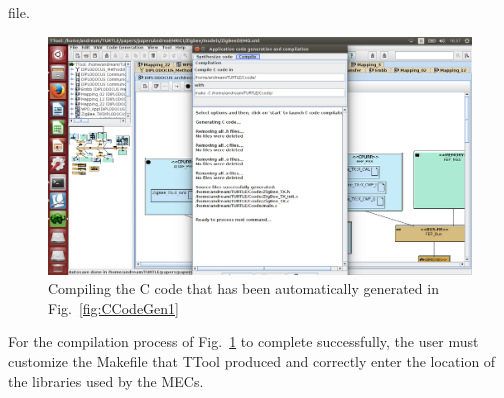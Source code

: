 \documentclass{llncs}
\newcommand{\screenshotsize}{1.0\textwidth}
\begin{document}
file.
%
\begin{figure}[htbp]
	\centering
 	\includegraphics[width=\screenshotsize]{figures/screenshot/CCodeGen2.png}
	\caption{Compiling the C code that has been automatically generated in Fig.~\ref{fig:CCodeGen1}}
	\label{fig:CCodeGen2}
\end{figure}
%
For the compilation process of Fig.~\ref{fig:CCodeGen2} to complete successfully, the user must customize the Makefile
that TTool produced and correctly enter the location of the libraries used by the MECs.\\
%
\end{document}
